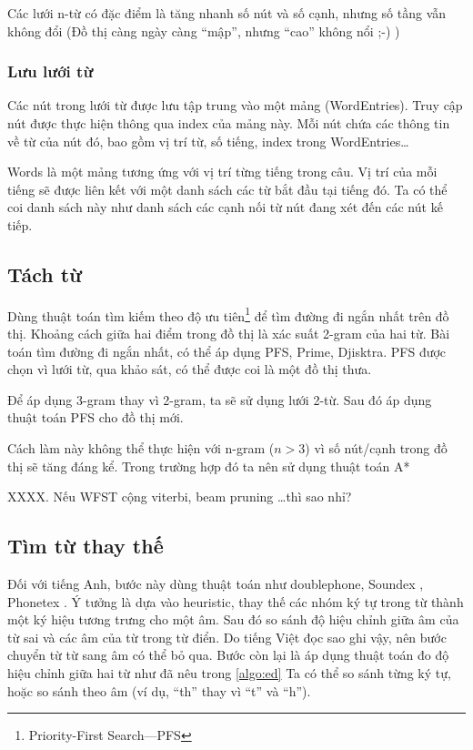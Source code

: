 \documentclass[a4paper,oneside]{book} %
\begin{document}
Các lưới n-từ có đặc điểm là tăng nhanh số nút và số cạnh, nhưng số
tầng vẫn không đổi (Đồ thị càng ngày càng ``mập'', nhưng ``cao''
không nổi ;-) )


\subsubsection{Lưu lưới từ}

Các nút trong lưới từ được lưu tập trung vào một mảng
(WordEntries). Truy cập nút được thực hiện thông qua index của mảng
này. Mỗi nút chứa các thông tin về từ của nút đó, bao gồm vị trí từ,
số tiếng, index trong WordEntries\ldots{}

Words là một mảng tương ứng với vị trí từng tiếng trong câu. Vị trí
của mỗi tiếng sẽ được liên kết với một danh sách các từ bắt đầu tại
tiếng đó. Ta có thể coi danh sách này như danh sách các cạnh nối từ
nút đang xét đến các nút kế tiếp.


\subsection{Tách từ}
\label{sub:wordseg}

Dùng thuật toán tìm kiếm theo độ ưu tiên\footnote{Priority-First
Search---PFS} để tìm đường đi ngắn nhất trên đồ thị. Khoảng cách giữa hai
điểm trong đồ thị là xác suất 2-gram của hai từ. Bài toán tìm đường
đi ngắn nhất, có thể áp dụng PFS, Prime, Djisktra. PFS được chọn vì
lưới từ, qua khảo sát, có thể được coi là một đồ thị thưa.

Để áp dụng 3-gram thay vì 2-gram, ta sẽ sử dụng lưới 2-từ. Sau đó áp
dụng thuật toán PFS cho đồ thị mới.

Cách làm này không thể thực hiện với n-gram ($n > 3$) vì số nút/cạnh
trong đồ thị sẽ tăng đáng kể. Trong trường hợp đó ta nên sử dụng
thuật toán A*

XXXX. Nếu WFST cộng viterbi, beam pruning \ldots thì sao nhỉ?


\subsection{Tìm từ thay thế}

Đối với tiếng Anh, bước này dùng thuật toán như doublephone, Soundex
\cite{soundex}, Phonetex \cite{phonetex}. Ý tưởng 
là dựa vào heuristic, thay thế các nhóm ký tự trong từ thành một ký
hiệu tương trưng cho một âm. Sau đó so sánh độ hiệu chỉnh giữa âm của
từ sai và các âm của từ trong từ điển. Do tiếng Việt đọc sao ghi vậy,
nên bước chuyển từ từ sang âm có thể bỏ qua. Bước còn lại là áp dụng
thuật toán đo độ hiệu chỉnh giữa hai từ như đã nêu trong \ref{algo:ed}
Ta có thể so sánh từng ký tự, hoặc so sánh theo âm (ví dụ, ``th'' thay
vì ``t'' và ``h'').
\end{document}
